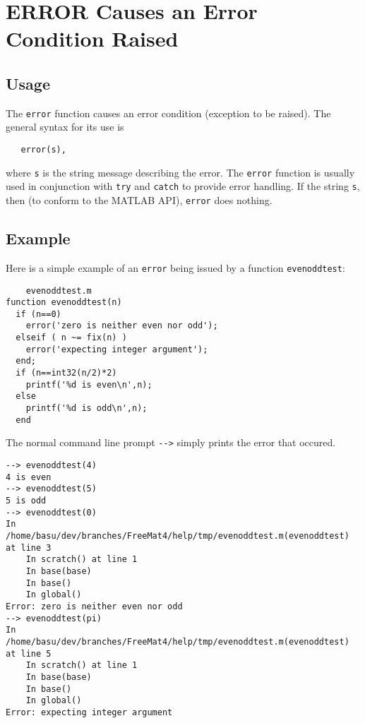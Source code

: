 \section{ERROR Causes an Error Condition Raised}

\subsection{Usage}

The \verb|error| function causes an error condition (exception
to be raised).  The general syntax for its use is
\begin{verbatim}
   error(s),
\end{verbatim}
where \verb|s| is the string message describing the error.  The
\verb|error| function is usually used in conjunction with \verb|try|
and \verb|catch| to provide error handling.  If the string \verb|s|,
then (to conform to the MATLAB API), \verb|error| does nothing.
\subsection{Example}

Here is a simple example of an \verb|error| being issued by a function
\verb|evenoddtest|:
\begin{verbatim}
    evenoddtest.m
function evenoddtest(n)
  if (n==0)
    error('zero is neither even nor odd');
  elseif ( n ~= fix(n) )
    error('expecting integer argument');
  end;
  if (n==int32(n/2)*2)
    printf('%d is even\n',n);
  else
    printf('%d is odd\n',n);
  end
\end{verbatim}
The normal command line prompt \verb|-->| simply prints the error
that occured.
\begin{verbatim}
--> evenoddtest(4)
4 is even
--> evenoddtest(5)
5 is odd
--> evenoddtest(0)
In /home/basu/dev/branches/FreeMat4/help/tmp/evenoddtest.m(evenoddtest) at line 3
    In scratch() at line 1
    In base(base)
    In base()
    In global()
Error: zero is neither even nor odd
--> evenoddtest(pi)
In /home/basu/dev/branches/FreeMat4/help/tmp/evenoddtest.m(evenoddtest) at line 5
    In scratch() at line 1
    In base(base)
    In base()
    In global()
Error: expecting integer argument
\end{verbatim}
